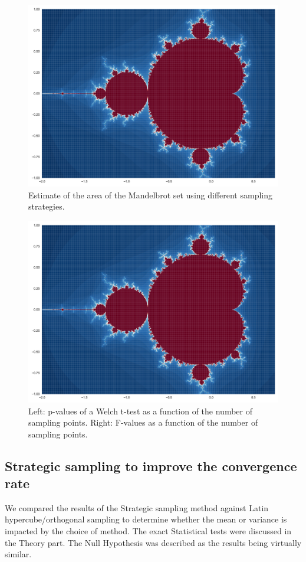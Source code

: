 \documentclass{uva-inf-article}
\begin{document}
\begin{figure}[h]
    \centering
    \includegraphics[width=.85\textwidth]{fractal.pdf}
    \caption{Estimate of the area of the Mandelbrot set using different sampling strategies.}
    \label{fig:stratified}
\end{figure}

\begin{figure}[h]
    \centering
   \includegraphics[width=.85\textwidth]{fractal.pdf}
    \caption{Left: p-values of a Welch t-test as a function of the number of sampling points. Right: F-values as a function of the number of sampling points.}
    \label{fig:stratified_stats}
\end{figure}


\subsection{Strategic sampling to improve the convergence rate}
We compared the results of the Strategic sampling method against Latin hypercube/orthogonal sampling to determine whether the mean or variance is impacted by the choice of method. The exact Statistical tests were discussed in the Theory part. The Null Hypothesis was described as the results being virtually similar.
\end{document}
